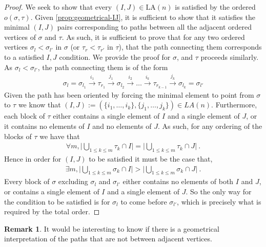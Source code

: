 \documentclass{amsart}
\theoremstyle{definition}
\newtheorem{remark}[theorem]{Remark}
\newcommand{\LA}{\mathrm{LA}}
\begin{document}
\begin{proof}
We seek to show that every $(I,J) \in \LA(n)$ is satisfied by the ordered $o(\sigma,\tau)$.
Given \cref{prop:geometrical-IJ}, it is sufficient to show that it satisfies the minimal $(I,J)$ pairs corresponding to paths between all the adjacent ordered vertices of $\sigma$ and $\tau$.
As such, it is sufficient to prove that for any two ordered vertices $\sigma_l<\sigma_{l'}$ in $\sigma$ (or $\tau_r<\tau_{r'}$ in $\tau$), that the path connecting them corresponds to a satisfied $I,J$ condition.
We provide the proof for $\sigma$, and $\tau$ proceeds similarly.
As $\sigma_l<\sigma_{l'}$, the path connecting them is of the form
\begin{align*}
    \sigma_l = \sigma_{l_1} \xrightarrow{i_1} \tau_{r_1}\xrightarrow{j_1} \sigma_{l_2} \xrightarrow{i_2}\dots \xrightarrow{i_{k}} \tau_{r_{k-1}} \xrightarrow{j_k} \sigma_{l_k}= \sigma_{l'}
\end{align*}
Given the path has been oriented by forcing the minimal element to point from $\sigma$ to $\tau$ we know that $(I,J) := (\{i_1,\dots,i_k\},\{j_1,\dots,j_k\}) \in LA(n)$.
Furthermore, each block of $\tau$ either contains a single element of $I$ and a single element of $J$, or it contains no elements of $I$ and no elements of $J$. 
As such, for any ordering of the blocks of $\tau$ we have that
\begin{align*}
    \forall m, \bigg|\bigcup_{1\leq k \leq m} \tau_{k} \cap I \bigg| = \bigg|\bigcup_{1\leq k \leq m} \tau_{k} \cap J \bigg| \ .
\end{align*}
Hence in order for $(I,J)$ to be satisfied it must be the case that,
\begin{align*}
    \exists m, \bigg| \bigcup_{1\leq k \leq m} \sigma_k \cap I \bigg| > \bigg|\bigcup_{1\leq k \leq m} \sigma_k \cap J \bigg| \ .
\end{align*}
Every block of $\sigma$ excluding $\sigma_l$ and $\sigma_{l'}$ either contains no elements of both $I$ and $J$, or contains a single element of $I$ and a single element of $J$. 
So the only way for the condition to be satisfied is for $\sigma_l$ to come before $\sigma_{l'}$, which is precisely what is required by the total order.
\end{proof}

\begin{remark}
    It would be interesting to know if there is a geometrical interpretation of the paths that are not between adjacent vertices. 
\end{remark}
\end{document}
